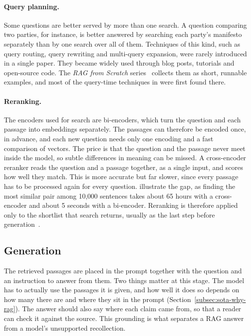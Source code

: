 \paragraph{Query planning.} Some questions are better served by more than one search. A question comparing two parties, for instance, is better answered by searching each party's manifesto separately than by one search over all of them. Techniques of this kind, such as query routing, query rewriting and multi-query expansion, were rarely introduced in a single paper. They became widely used through blog posts, tutorials and open-source code. The \textit{RAG from Scratch} series~\citep{rag-from-scratch} collects them as short, runnable examples, and most of the query-time techniques in \sysname{} were first found there.

\paragraph{Reranking.} The encoders used for search are bi-encoders, which turn the question and each passage into embeddings separately. The passages can therefore be encoded once, in advance, and each new question needs only one encoding and a fast comparison of vectors. The price is that the question and the passage never meet inside the model, so subtle differences in meaning can be missed. A cross-encoder reranker reads the question and a passage together, as a single input, and scores how well they match. This is more accurate but far slower, since every passage has to be processed again for every question. \citet{reimers2019sentencebert} illustrate the gap, as finding the most similar pair among 10,000 sentences takes about 65 hours with a cross-encoder and about 5 seconds with a bi-encoder. Reranking is therefore applied only to the shortlist that search returns, usually as the last step before generation~\citep{nogueira2019passagererankingbert,bge-reranker-v2-m3}.

\subsection{Generation} \label{subsec:sota-generation}

The retrieved passages are placed in the prompt together with the question and an instruction to answer from them. Two things matter at this stage. The model has to actually use the passages it is given, and how well it does so depends on how many there are and where they sit in the prompt (Section~\ref{subsec:sota-why-rag}). The answer should also say where each claim came from, so that a reader can check it against the source. This grounding is what separates a RAG answer from a model's unsupported recollection.

